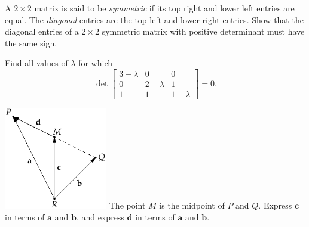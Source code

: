\documentclass[prettycode,shellescape]{watsonbook}
\begin{document}

\begin{aexercise}
  A $2\times 2$ matrix is said to be \textit{symmetric} if its top
  right and lower left entries are equal. The \textit{diagonal}
  entries are the top left and lower right entries. Show that the
  diagonal entries of a $2\times 2$ symmetric matrix with positive
  determinant must have the same sign.
\end{aexercise}

\begin{aexercise}
  Find all values of $\lambda$ for which 
  \[
    \det \left[
      \begin{array}{ccc}
        3 - \lambda & 0 & 0 \\
        0 & 2-\lambda & 1 \\
        1 & 1 & 1 - \lambda
      \end{array}
    \right]
    = 0. 
  \]
\end{aexercise}


\begin{aexercise}
  \begin{insetfigure}{\includegraphics[width=4.5cm]{exercisefigures/midpoint}}
    The point $M$ is the midpoint of $P$ and $Q$. Express $\mathbf{c}$
    in terms of $\mathbf{a}$ and $\mathbf{b}$, and express $\mathbf{d}$
    in terms of $\mathbf{a}$ and $\mathbf{b}$.
  \end{insetfigure}
\end{aexercise}
\end{document}
